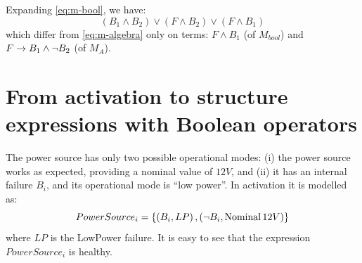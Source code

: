 \documentclass[12pt,openright,twoside,a4paper,oldfontcommands,english,brazil,final]{abntex2}
\theoremstyle{theo}
\def\xbeforeop{\ensuremath\rightarrow}
\newcommand{\xbefore}[2]{\ensuremath #1 \xbeforeop #2 }
\newcommand{\Nominal}[1]{\ensuremath\mathop{\mathrm{Nominal}} #1}
\begin{document}
Expanding \cref{eq:m-bool}, we have:
\[
(B_1\land B_2) \lor (F \land B_2) \lor (F \land B_1)
\]
%
which differ from \cref{eq:m-algebra} only on terms: $F \land B_1$ (of $M_{bool}$) and $\xbefore{F}{B_1}\land \lnot B_2$ (of $M_A$).

\section{From \ac*{activation} to structure expressions with Boolean operators}
\label{sec:activation-to-structure-expressions-boolean-operators}

The power source has only two possible operational modes: (i) the power source works as expected, providing a nominal value of $12V$, and (ii) it has an internal failure $B_i$, and its operational mode is ``low power''.
In \ac{activation} it is modelled as:
\begin{equation}
\label{eq:power-source}
PowerSource_i = \left\{
  \left(B_i, LP\right),
  \left(\lnot B_i, \Nominal{12V}\right)
  \right\}
\end{equation}
%
where $LP$ is the LowPower failure.
It is easy to see that the expression $PowerSource_i$ is healthy.
\end{document}
